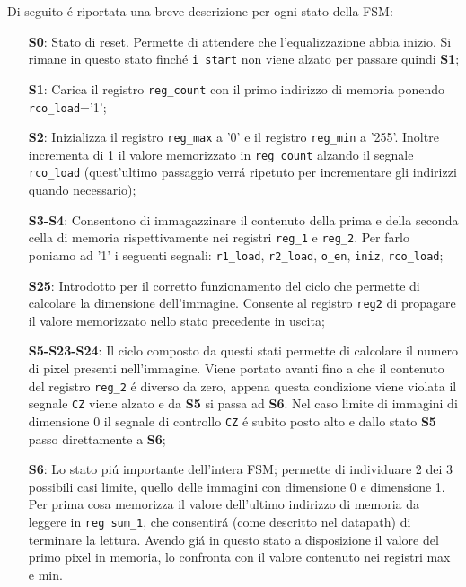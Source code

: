 Di seguito é riportata una breve descrizione per ogni stato della FSM:
\begin{itemize}
    \item[\textbf{S0}:]Stato di reset. Permette di attendere che l'equalizzazione abbia inizio. Si rimane in questo stato finché \texttt{i\_start} non viene alzato per passare quindi \textbf{S1};
    \item[\textbf{S1}:]Carica il registro \texttt{reg\_count} con il primo indirizzo di memoria ponendo \texttt{rco\_load}='1'; 
    \item[\textbf{S2}:]Inizializza il registro \texttt{reg\_max} a '0' e il registro \texttt{reg\_min} a '255'. Inoltre incrementa di 1 il valore memorizzato in \texttt{reg\_count} alzando il segnale \texttt{rco\_load} (quest'ultimo passaggio verrá ripetuto per incrementare gli indirizzi quando necessario);
    \item[\textbf{S3-S4}:] Consentono di immagazzinare il contenuto della prima e della seconda cella di memoria  rispettivamente nei registri \texttt{reg\_1} e \texttt{reg\_2}. Per farlo poniamo ad '1' i seguenti segnali: \texttt{r1\_load}, \texttt{r2\_load}, \texttt{o\_en}, \texttt{iniz}, \texttt{rco\_load};  

    \item[\textbf{S25}:]Introdotto per il corretto funzionamento del ciclo che permette di calcolare la dimensione dell'immagine. Consente al registro \texttt{reg2} di propagare il valore memorizzato nello stato precedente in uscita; 
    
    \item[\textbf{S5-S23-S24}:] Il ciclo composto da questi stati permette di calcolare il numero di pixel presenti nell'immagine. Viene portato avanti fino a che il contenuto del registro \texttt{reg\_2} é diverso da zero, appena questa condizione viene violata il segnale \texttt{CZ} viene alzato e da \textbf{S5} si passa ad \textbf{S6}. 
    Nel caso limite di immagini di dimensione 0 il segnale di controllo \texttt{CZ} é subito posto alto e dallo stato \textbf{S5} passo direttamente a \textbf{S6};
    
    \item[\textbf{S6}:] Lo stato piú importante dell'intera FSM; permette di individuare 2 dei 3 possibili casi limite, quello delle immagini con dimensione 0 e dimensione 1.
    Per prima cosa memorizza il valore dell'ultimo indirizzo di memoria da leggere in \texttt{reg sum\_1}, che consentirá (come descritto nel datapath) di terminare la lettura. 
    Avendo giá in questo stato a disposizione il valore del primo pixel in memoria, lo confronta con il valore contenuto nei registri max e min.
    

\end{itemize}
